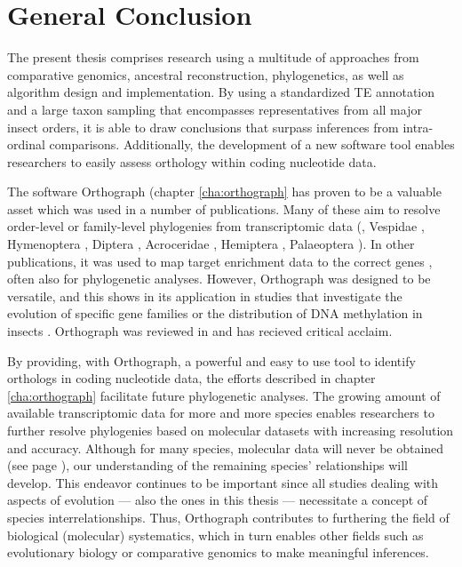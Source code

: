 \chapter{General Conclusion}
\label{conclusion}

The present thesis comprises research using a multitude of approaches
from comparative genomics, ancestral reconstruction, phylogenetics, as
well as algorithm design and implementation. By using a standardized TE
annotation and a large taxon sampling that encompasses representatives
from all major insect orders, it is able to draw conclusions that
surpass inferences from intra-ordinal comparisons. Additionally, the
development of a new software tool enables researchers to easily assess
orthology within coding nucleotide data.

The software Orthograph (chapter \ref{cha:orthograph} has proven to be a
valuable asset which was used in a number of publications. Many of these
aim to resolve order-level or family-level phylogenies from
transcriptomic data (\eg, Vespidae \citep{Bank2017}, Hymenoptera
\citep{Peters2017}, Diptera \citep{Kutty2018}, Acroceridae
\citep{Gillung2018}, Hemiptera \citep{Johnson2018}, Palaeoptera
\citep{Simon2018}). In other publications, it was used to map target
enrichment data to the correct genes \citep{Mayer2016, Sann2018,
Shin2018}, often also for phylogenetic analyses. However, Orthograph was
designed to be versatile, and this shows in its application in studies
that investigate the evolution of specific gene families
\citep{Pauli2016, Dowling2017} or the distribution of DNA methylation in
insects \citep{Provataris2018}. Orthograph was reviewed in
\citet{Nichio2017} and has recieved critical acclaim.

By providing, with Orthograph, a powerful and easy to use tool to
identify orthologs in coding nucleotide data, the efforts described in
chapter \ref{cha:orthograph} facilitate future phylogenetic analyses.
The growing amount of available transcriptomic data for more and more
species enables researchers to further resolve phylogenies based on
molecular datasets with increasing resolution and accuracy. Although for
many species, molecular data will never be obtained (see page
\pageref{mass-extinction}), our understanding of the remaining species'
relationships will develop. This endeavor continues to be important
since all studies dealing with aspects of evolution --- also the ones in
this thesis --- necessitate a concept of species interrelationships.
Thus, Orthograph contributes to furthering the field of biological
(molecular) systematics, which in turn enables other fields such as
evolutionary biology or comparative genomics to make meaningful
inferences.

